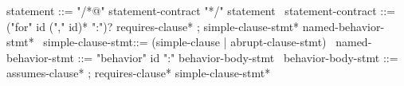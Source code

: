 \begin{syntax}
  statement ::= "/*@" statement-contract "*/" statement
  \
  statement-contract ::= ("for" id ("," id)* ":")? requires-clause* ;
    simple-clause-stmt* named-behavior-stmt*
  \
  simple-clause-stmt::= (simple-clause | abrupt-clause-stmt)
  \
  named-behavior-stmt ::= "behavior" id ":" behavior-body-stmt
  \
  behavior-body-stmt ::= assumes-clause* ;
       requires-clause* simple-clause-stmt*
\end{syntax}
